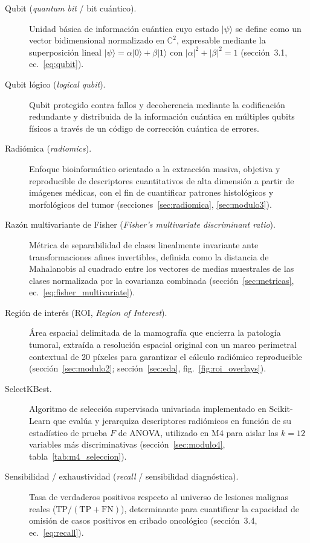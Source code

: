 \begin{description}
  \item[Qubit (\textit{quantum bit} / bit cuántico).] Unidad básica de información cuántica cuyo estado $|\psi\rangle$ se define como un vector bidimensional normalizado en $\mathbb{C}^2$, expresable mediante la superposición lineal $|\psi\rangle = \alpha|0\rangle + \beta|1\rangle$ con $|\alpha|^2 + |\beta|^2 = 1$ (sección~3.1, ec.~\ref{eq:qubit}).

  \item[Qubit lógico (\textit{logical qubit}).] Qubit protegido contra fallos y decoherencia mediante la codificación redundante y distribuida de la información cuántica en múltiples qubits físicos a través de un código de corrección cuántica de errores.

  \item[Radiómica (\textit{radiomics}).] Enfoque bioinformático orientado a la extracción masiva, objetiva y reproducible de descriptores cuantitativos de alta dimensión a partir de imágenes médicas, con el fin de cuantificar patrones histológicos y morfológicos del tumor (secciones~\ref{sec:radiomica}, \ref{sec:modulo3}).

  \item[Razón multivariante de Fisher (\textit{Fisher's multivariate discriminant ratio}).] Métrica de separabilidad de clases linealmente invariante ante transformaciones afines invertibles, definida como la distancia de Mahalanobis al cuadrado entre los vectores de medias muestrales de las clases normalizada por la covarianza combinada (sección~\ref{sec:metricas}, ec.~\ref{eq:fisher_multivariate}).

  \item[Región de interés (ROI, \textit{Region of Interest}).] Área espacial delimitada de la mamografía que encierra la patología tumoral, extraída a resolución espacial original con un marco perimetral contextual de 20 píxeles para garantizar el cálculo radiómico reproducible (sección~\ref{sec:modulo2}; sección~\ref{sec:eda}, fig.~\ref{fig:roi_overlays}).

  \item[SelectKBest.] Algoritmo de selección supervisada univariada implementado en Scikit-Learn que evalúa y jerarquiza descriptores radiómicos en función de su estadístico de prueba $F$ de ANOVA, utilizado en M4 para aislar las $k=12$ variables más discriminativas (sección~\ref{sec:modulo4}, tabla~\ref{tab:m4_seleccion}).

  \item[Sensibilidad / exhaustividad (\textit{recall} / sensibilidad diagnóstica).] Tasa de verdaderos positivos respecto al universo de lesiones malignas reales ($\mathrm{TP} / (\mathrm{TP} + \mathrm{FN})$), determinante para cuantificar la capacidad de omisión de casos positivos en cribado oncológico (sección~3.4, ec.~\ref{eq:recall}).


\end{description}
